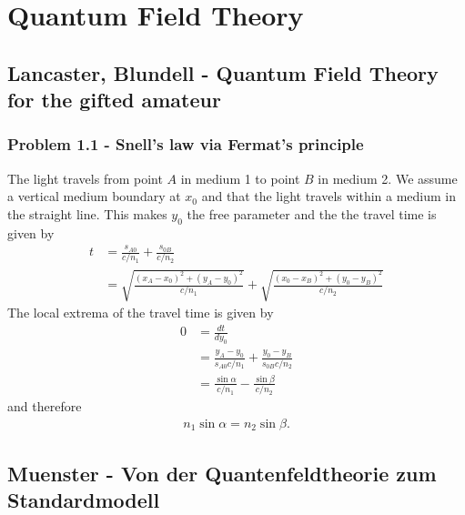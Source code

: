 \documentclass[10pt,a4paper]{article}
\theoremstyle{definition}
\begin{document}
\section{Quantum Field Theory}
\subsection{{\sc Lancaster, Blundell} - Quantum Field Theory for the gifted amateur}
\subsubsection{Problem 1.1 - Snell's law via Fermat's principle}
The light travels from point $A$ in medium 1 to point $B$ in medium 2. We assume a vertical medium boundary at $x_0$ and that the light travels within a medium in the straight line. This makes $y_0$ the free parameter and the the travel time is given by
\begin{align}
    t&=\frac{s_{A0}}{c/n_1}+\frac{s_{0B}}{c/n_2}\\
    &=\sqrt{\frac{(x_A-x_0)^2+(y_A-y_0)^2}{c/n_1}}+\sqrt{\frac{(x_0-x_B)^2+(y_0-y_B)^2}{c/n_2}}
\end{align}
The local extrema of the travel time is given by
\begin{align}
    0&=\frac{dt}{dy_0}\\
    &=\frac{y_A-y_0}{s_{A0}c/n_1}+\frac{y_0-y_B}{s_{0B}c/n_2}\\
    &=\frac{\sin\alpha}{c/n_1}-\frac{\sin\beta}{c/n_2}
\end{align}
and therefore
\begin{align}
n_1\sin\alpha=n_2\sin\beta.
\end{align}

\subsection{{\sc Muenster} - Von der Quantenfeldtheorie zum Standardmodell} 
\end{document}
